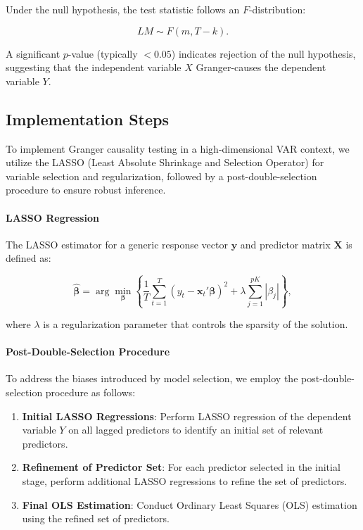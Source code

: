 \documentclass[11pt]{article}
\begin{document}
Under the null hypothesis, the test statistic follows an \(F\)-distribution:

\begin{equation}
LM \sim F(m, T - k).
\end{equation}

A significant \(p\)-value (typically \(< 0.05\)) indicates rejection of the null hypothesis, suggesting that the independent variable \(X\) Granger-causes the dependent variable \(Y\).

\subsection{Implementation Steps}

To implement Granger causality testing in a high-dimensional VAR context, we utilize the LASSO (Least Absolute Shrinkage and Selection Operator) for variable selection and regularization, followed by a post-double-selection procedure to ensure robust inference.

\paragraph{LASSO Regression}

The LASSO estimator for a generic response vector \(\mathbf{y}\) and predictor matrix \(\mathbf{X}\) is defined as:

\begin{equation}
\hat{\boldsymbol{\beta}} = \arg\min_{\boldsymbol{\beta}} \left\{ \frac{1}{T} \sum_{t=1}^{T} (y_t - \mathbf{x}_t' \boldsymbol{\beta})^2 + \lambda \sum_{j=1}^{pK} |\beta_j| \right\},
\end{equation}

where \(\lambda\) is a regularization parameter that controls the sparsity of the solution.

\paragraph{Post-Double-Selection Procedure}

To address the biases introduced by model selection, we employ the post-double-selection procedure as follows:

\begin{enumerate}
    \item \textbf{Initial LASSO Regressions}: Perform LASSO regression of the dependent variable \(Y\) on all lagged predictors to identify an initial set of relevant predictors.
    \item \textbf{Refinement of Predictor Set}: For each predictor selected in the initial stage, perform additional LASSO regressions to refine the set of predictors.
    \item \textbf{Final OLS Estimation}: Conduct Ordinary Least Squares (OLS) estimation using the refined set of predictors.
\end{enumerate}
\end{document}
